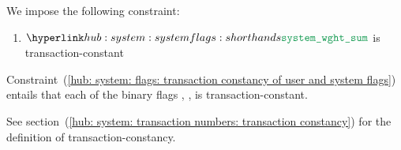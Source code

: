 We impose the following constraint:
\begin{enumerate}
	\item \label{hub: system: flags: transaction constancy of user and system flags}
		$\weightedFlagSum$ is transaction-constant
\end{enumerate}
\saNote{}\label{hub: system: flags: individual flags are transaction constant}
Constraint~(\ref{hub: system: flags: transaction constancy of user and system flags})
entails that each of the binary flags
\sysi{},
\user{},
\sysf{}
is transaction-constant.

\saNote{}
See section~(\ref{hub: system: transaction numbers: transaction constancy}) for the definition of transaction-constancy.
